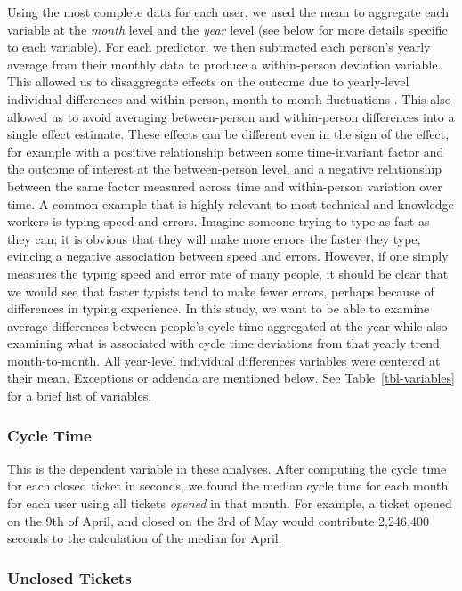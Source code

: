 \documentclass[manuscript,screen,review]{acmart}
\begin{document}
Using the most complete data for each user, we used the mean to
aggregate each variable at the \emph{month} level and the \emph{year}
level (see below for more details specific to each variable). For each
predictor, we then subtracted each person's yearly average from their
monthly data to produce a within-person deviation variable. This allowed
us to disaggregate effects on the outcome due to yearly-level individual
differences and within-person, month-to-month fluctuations
\citep{curranDisaggregationPersonPerson2011}. This also allowed us to
avoid averaging between-person and within-person differences into a
single effect estimate. These effects can be different even in the sign
of the effect, for example with a positive relationship between some
time-invariant factor and the outcome of interest at the between-person
level, and a negative relationship between the same factor measured
across time and within-person variation over time. A common example that
is highly relevant to most technical and knowledge workers is typing
speed and errors. Imagine someone trying to type as fast as they can; it
is obvious that they will make more errors the faster they type,
evincing a negative association between speed and errors. However, if
one simply measures the typing speed and error rate of many people, it
should be clear that we would see that faster typists tend to make fewer
errors, perhaps because of differences in typing experience. In this
study, we want to be able to examine average differences between
people's cycle time aggregated at the year while also examining what is
associated with cycle time deviations from that yearly trend
month-to-month. All year-level individual differences variables were
centered at their mean. Exceptions or addenda are mentioned below. See
Table~\ref{tbl-variables} for a brief list of variables.

\subsubsection{Cycle Time}\label{cycle-time-1}

This is the dependent variable in these analyses. After computing the
cycle time for each closed ticket in seconds, we found the median cycle
time for each month for each user using all tickets \emph{opened} in
that month. For example, a ticket opened on the 9th of April, and closed
on the 3rd of May would contribute 2,246,400 seconds to the calculation
of the median for April.

\subsubsection{Unclosed Tickets}\label{unclosed-tickets}
\end{document}
